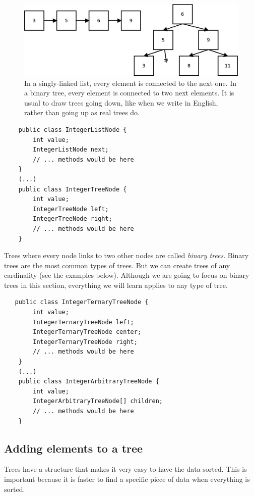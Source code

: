 \begin{figure}[hbtp]
  \centering
  \includegraphics[width=\textwidth]{gfx/list-tree}
  \caption{In a singly-linked list, every element is connected to the
    next one. In a binary tree, every element is connected to two next
    elements. It is usual to draw trees going down, like when we
    write in English, rather than going up as real trees do.}
  \label{fig:listree}
\end{figure}

\begin{verbatim}
    public class IntegerListNode {
        int value;
        IntegerListNode next;
        // ... methods would be here
    }
    (...)
    public class IntegerTreeNode {
        int value;
        IntegerTreeNode left;
        IntegerTreeNode right;
        // ... methods would be here
    }
\end{verbatim}

Trees where every node links to two other nodes are called
\emph{binary trees}. Binary trees are the most common types of
trees. But we can create trees of any cardinality (see the examples
below). Although we are going to focus on binary
trees in this section, everything we will learn applies to
any type of tree. 

\begin{verbatim}
   public class IntegerTernaryTreeNode {
        int value;
        IntegerTernaryTreeNode left;
        IntegerTernaryTreeNode center;
        IntegerTernaryTreeNode right;
        // ... methods would be here
    }
    (...)
    public class IntegerArbitraryTreeNode {
        int value;
        IntegerArbitraryTreeNode[] children;
        // ... methods would be here
    }
\end{verbatim}

\subsection{Adding elements to a tree}
\label{sec:adding-elements-tree}

Trees have a structure that makes it very easy to have the data
sorted. This is important because it is faster to find a specific
piece of data when everything is sorted. 

